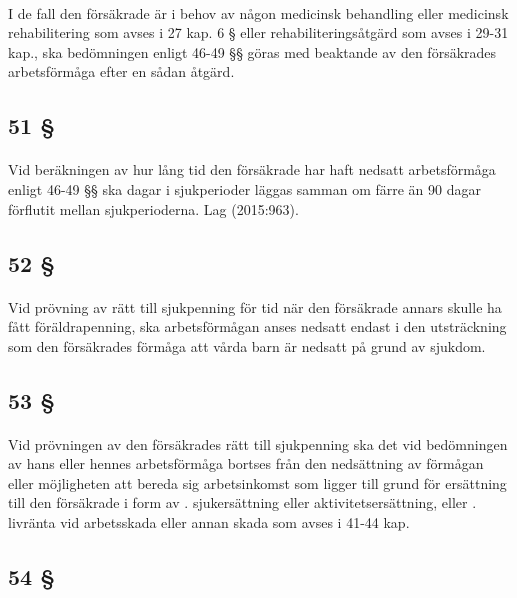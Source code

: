 \documentclass[a4paper,notitlepage,openany,10pt]{book}
\begin{document}
\paragraph*{}
I de fall den försäkrade är i behov av någon medicinsk behandling eller medicinsk rehabilitering som avses i 27 kap. 6 § eller rehabiliteringsåtgärd som avses i 29-31 kap., ska bedömningen enligt 46-49 §§ göras med beaktande av den försäkrades arbetsförmåga efter en sådan åtgärd.
\subsection*{51 §}
\paragraph*{}
Vid beräkningen av hur lång tid den försäkrade har haft nedsatt arbetsförmåga enligt 46-49 §§ ska dagar i sjukperioder läggas samman om färre än 90 dagar förflutit mellan sjukperioderna.
Lag (2015:963).
\subsection*{52 §}
\paragraph*{}
Vid prövning av rätt till sjukpenning för tid när den försäkrade annars skulle ha fått föräldrapenning, ska arbetsförmågan anses nedsatt endast i den utsträckning som den försäkrades förmåga att vårda barn är nedsatt på grund av sjukdom.
\subsection*{53 §}
\paragraph*{}
Vid prövningen av den försäkrades rätt till sjukpenning ska det vid bedömningen av hans eller hennes arbetsförmåga bortses från den nedsättning av förmågan eller möjligheten att bereda sig arbetsinkomst som ligger till grund för ersättning till den försäkrade i form av
. sjukersättning eller aktivitetsersättning, eller
. livränta vid arbetsskada eller annan skada som avses i 41-44 kap.
\subsection*{54 §}
\end{document}
